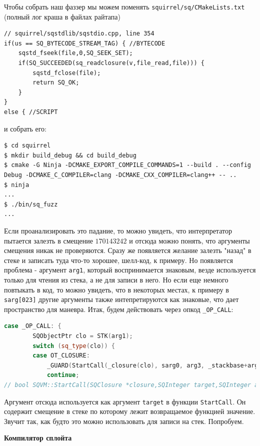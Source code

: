 \documentclass[idxtotoc,hyperref,openany,oneside]{files/pwn} %
\begin{document}
Чтобы собрать наш фаззер мы можем поменять \verb|squirrel/sq/CMakeLists.txt| (полный лог краша в файлах райтапа)
\begin{lstlisting}
// squirrel/sqstdlib/sqstdio.cpp, line 354
if(us == SQ_BYTECODE_STREAM_TAG) { //BYTECODE
    sqstd_fseek(file,0,SQ_SEEK_SET);
    if(SQ_SUCCEEDED(sq_readclosure(v,file_read,file))) {
        sqstd_fclose(file);
        return SQ_OK;
    }
}
else { //SCRIPT
\end{lstlisting}

и собрать его:
\begin{lstlisting}
$ cd squirrel
$ mkdir build_debug && cd build_debug
$ cmake -G Ninja -DCMAKE_EXPORT_COMPILE_COMMANDS=1 --build . --config Debug -DCMAKE_C_COMPILER=clang -DCMAKE_CXX_COMPILER=clang++ -- ..
$ ninja
...
$ ./bin/sq_fuzz
...
\end{lstlisting}

Если проанализировать это падание, то можно увидеть, что интерпретатор пытается залезть в смещение $170143242$ и отсюда можно понять, что аргументы смещения никак не проверяются. Сразу же появляется желание залезть "назад" в стеке и записать туда что-то хорошее, шелл-код, к примеру. Но появляется проблема - аргумент \verb|arg1|, который воспринимается знаковым, везде используется только для чтения из стека, а не для записи в него. Но если еще немного повтыкать в код, то можно увидеть, что в некоторых местах, к примеру в \verb|sarg[023]| другие аргументы также интепретируются как знаковые, что дает пространство для маневра. Итак, будем действовать через опкод \verb|_OP_CALL|:
\begin{lstlisting}[language=C++,
                   directivestyle={\color{black}}
                   emph={int,char,double,float,unsigned},
                   emphstyle={\color{blue}}
                  ]
case _OP_CALL: {
        SQObjectPtr clo = STK(arg1);
        switch (sq_type(clo)) {
        case OT_CLOSURE:
            _GUARD(StartCall(_closure(clo), sarg0, arg3, _stackbase+arg2, false));
            continue;
// bool SQVM::StartCall(SQClosure *closure,SQInteger target,SQInteger args,SQInteger stackbase,bool tailcall)
\end{lstlisting}

Аргумент отсюда используется как аргумент \verb|target| в функции \verb|StartCall|. Он содержит смещение в стеке по которому лежит возвращаемое функцией значение. Звучит так, как будто это можно использовать для записи на стек. Попробуем.

\textbf{Компилятор сплойта}
\end{document}
